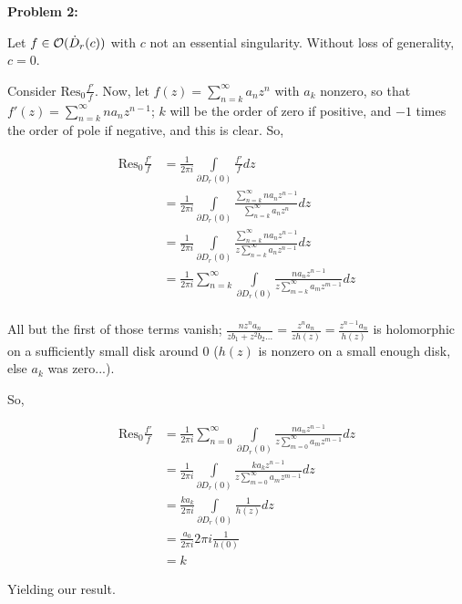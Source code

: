 \documentclass[a4paper,12pt]{article}
\begin{document}
\shunt

{\bf Problem 2:} %

Let $f \in \mathcal{O}(\dot{D}_r(c))$ with $c$ not an essential singularity. Without loss of generality, $c=0$.

Consider $\text{Res}_0 \frac{f'}{f}$.  Now, let $f(z) = \sum\limits_{n=k}^\infty a_nz^n$ with $a_k$ nonzero, so that $f'(z) = \sum\limits_{n=k}^\infty na_nz^{n-1}$; $k$ will be the order of zero if positive, and $-1$ times the order of pole if negative, and this is clear. So,

\begin{align*} %
\text{Res}_0 \frac{f'}{f}  &= \frac{1}{2\pi i} \int\limits_{ \partial D_r(0)} \frac{f'}{f} dz\\
&= \frac{1}{2\pi i} \int\limits_{ \partial D_r(0)} \frac{\sum\limits_{n=k}^\infty na_nz^{n-1}}{\sum\limits_{n=k}^\infty a_nz^n} dz\\
&= \frac{1}{2\pi i} \int\limits_{ \partial D_r(0)} \frac{\sum\limits_{n=k}^\infty na_nz^{n-1}}{z\sum\limits_{n=k}^\infty a_{n}z^{n-1}} dz\\
&= \frac{1}{2\pi i} \sum\limits_{n=k}^\infty \int\limits_{ \partial D_r(0)} \frac{na_nz^{n-1}}{z\sum\limits_{m=k}^\infty a_{m}z^{m-1}} dz\\
\end{align*} 

All but the first of those terms vanish; $\frac{nz^na_n}{zb_1 + z^2b_2 \ldots } = \frac{z^na_n}{zh(z)} = \frac{z^{n-1}a_n}{h(z)}$ is holomorphic on a sufficiently small disk around $0$ ($h(z)$ is nonzero on a small enough disk, else $a_k$ was zero...).

So, 

\begin{align*}
\text{Res}_0 \frac{f'}{f}  &= \frac{1}{2\pi i} \sum\limits_{n=0}^\infty \int\limits_{ \partial D_r(0)} \frac{na_nz^{n-1}}{z\sum\limits_{m=0}^\infty a_{m}z^{m-1}} dz\\
&= \frac{1}{2\pi i} \int\limits_{ \partial D_r(0)} \frac{ka_kz^{n-1}}{z\sum\limits_{m=0}^\infty a_{m}z^{m-1}} dz\\
&= \frac{ka_k}{2\pi i}  \int\limits_{ \partial D_r(0)} \frac{1}{h(z)} dz\\
&= \frac{a_0}{2\pi i}  2 \pi i \frac{1}{h(0)}\\
&= k
\end{align*}

Yielding our result. 
\end{document}
